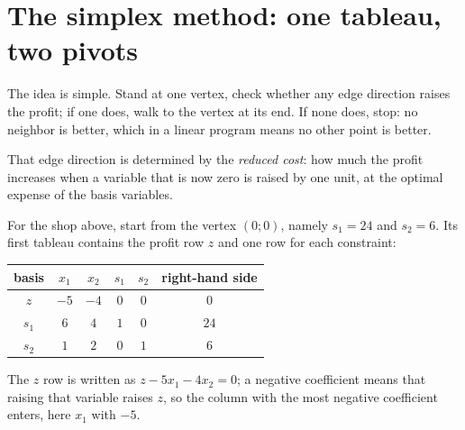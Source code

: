 \section{The simplex method: one tableau, two pivots}

The idea is simple. Stand at one vertex, check whether any edge direction raises the profit; if
one does, walk to the vertex at its end. If none does, stop: no neighbor is better, which in a
linear program means no other point is better.

That edge direction is determined by the \emph{reduced cost}: how much the profit increases
when a variable that is now zero is raised by one unit, at the optimal expense of the basis
variables.


For the shop above, start from the vertex $(0;0)$, namely $s_{1}=24$ and $s_{2}=6$. Its first
tableau contains the profit row $z$ and one row for each constraint:
\begin{center}
\begin{tabular}{c|cccc|c}
\hline
basis & $x_{1}$ & $x_{2}$ & $s_{1}$ & $s_{2}$ & right-hand side \\
\hline
$z$   & $-5$ & $-4$ & $0$ & $0$ & $0$ \\
$s_{1}$ & $6$ & $4$ & $1$ & $0$ & $24$ \\
$s_{2}$ & $1$ & $2$ & $0$ & $1$ & $6$ \\
\hline
\end{tabular}
\end{center}
The $z$ row is written as $z-5x_{1}-4x_{2}=0$; a negative coefficient means that raising that
variable raises $z$, so the column with the most negative coefficient enters, here $x_{1}$ with
$-5$.

